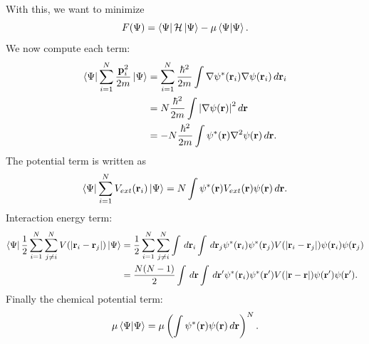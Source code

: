 \documentclass{book}
\theoremstyle{definition}
\newcommand{\ham}{\mathcal{H}}
\newcommand{\f}[2]{\frac{#1}{#2}}
\newcommand{\lp}{\left(}
\newcommand{\rp}{\right)}
\begin{document}
With this, we want to minimize
\begin{equation*}
F(\Psi) = \bra{\Psi} \ham \ket{\Psi} - \mu \braket{\Psi}.
\end{equation*}
We now compute each term:
\begin{align*}
\bra{\Psi}  \sum^N_{i=1} \f{\mathbf{p}_i^2}{2m}  \ket{\Psi} 
&= \sum^N_{i=1}\f{\hbar^2}{2m} \int \nabla \psi^*(\mathbf{r}_i) \nabla \psi(\mathbf{r}_i) \,d\mathbf{r}_i \\
&=  N\f{\hbar^2}{2m} \int \abs{\nabla \psi(\mathbf{r})}^2 \,d\mathbf{r}\\
&= -N \f{\hbar^2}{2m}\int \psi^*(\mathbf{r})\nabla^2 \psi(\mathbf{r})\,d\mathbf{r}.
\end{align*}
The potential term is written as 
\begin{align*}
\bra{\Psi} \sum^N_{i=1}V_{ext}(\mathbf{r}_i) \ket{\Psi} = N \int \psi^*(\mathbf{r}) V_{ext}(\mathbf{r}) \psi(\mathbf{r})\,d\mathbf{r}.
\end{align*}
Interaction energy term:
\begin{align*}
\bra{\Psi} \f{1}{2}\sum^N_{i=1}\sum^N_{j\neq i} V(\abs{\mathbf{r}_i - \mathbf{r}_j}) \ket{\Psi} 
&= \f{1}{2}\sum^N_{i=1}\sum^N_{j\neq i} \int \,d\mathbf{r}_i \int \,d\mathbf{r}_j \psi^*(\mathbf{r}_i) \psi^*(\mathbf{r}_j) V(\abs{\mathbf{r}_i - \mathbf{r}_j}) \psi(\mathbf{r}_i) \psi(\mathbf{r}_j) \\
&= \f{N(N-1)}{2} \int \,d\mathbf{r} \int \,d\mathbf{r}' \psi^*(\mathbf{r}_i) \psi^*(\mathbf{r}') V(\abs{\mathbf{r} - \mathbf{r}}) \psi(\mathbf{r}') \psi(\mathbf{r}').
\end{align*}
Finally the chemical potential term:
\begin{align*}
\mu \braket{\Psi} = \mu \lp \int \psi^*(\mathbf{r}) \psi(\mathbf{r}) \,d\mathbf{r} \rp^N.
\end{align*}
\end{document}
